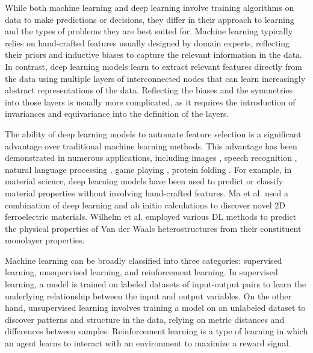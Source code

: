 
While both machine learning and deep learning involve training algorithms on data to make predictions or decisions, they differ in their approach to learning and the types of problems they are best suited for. Machine learning typically relies on hand-crafted features usually designed by domain experts, reflecting their priors and inductive biases to capture the relevant information in the data. In contrast, deep learning models learn to extract relevant features directly from the data using multiple layers of interconnected nodes that can learn increasingly abstract representations of the data. Reflecting the biases and the symmetries into those layers is usually more complicated, as it requires the introduction of invariances and equivariance into the definition of the layers.

The ability of deep learning models to automate feature selection is a significant advantage over traditional machine learning methods. This advantage has been demonstrated in numerous applications, including images \cite{rombachHighResolutionImageSynthesis2022a}, speech recognition \cite{radfordRobustSpeechRecognition2022}, natural language processing \cite{brownLanguageModelsAre2020a}, game playing \cite{silverMasteringGameGo2016}, protein folding \cite{jumperHighlyAccurateProtein2021a}.  For example, in material science, deep learning models have been used to predict or classify material properties without involving hand-crafted features. Ma et al. \cite{ma2021large} used a combination of deep learning and ab initio calculations to discover novel 2D ferroelectric materials. Wilhelm et al. \cite{willhelm2022predicting} employed various DL methods to predict the physical properties of Van der Waals heterostructures from their constituent monolayer properties.

Machine learning can be broadly classified into three categories: supervised learning, unsupervised learning, and reinforcement learning. In supervised learning, a model is trained on labeled datasets of input-output pairs to learn the underlying relationship between the input and output variables. On the other hand, unsupervised learning involves training a model on an unlabeled dataset to discover patterns and structure in the data, relying on metric distances and differences between samples. Reinforcement learning is a type of learning in which an agent learns to interact with an environment to maximize a reward signal.

